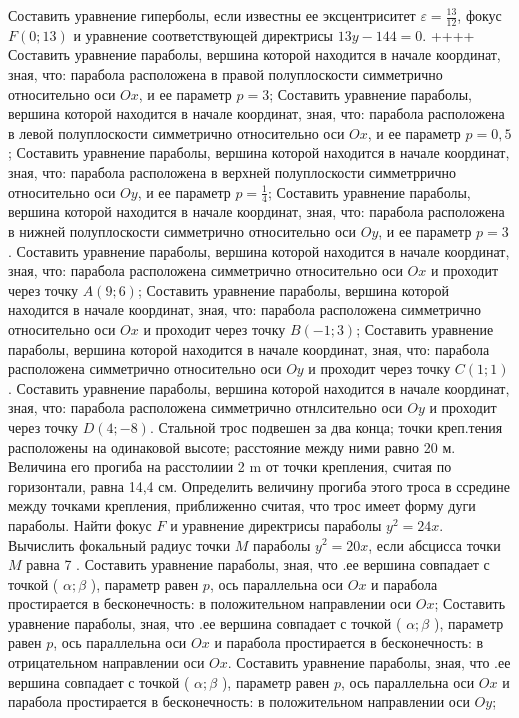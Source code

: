 Составить уравнение гиперболы, если известны ее эксцентриситет $\varepsilon=\frac{13}{12}$, фокус $F(0 ; 13)$ и уравнение соответствующей директрисы $13 y-144=0$.
++++
Составить уравнение параболы, вершина которой находится в начале координат, зная, что: парабола расположена в правой полуплоскости симметрично относительно оси $O x$, и ее параметр $p=3$;
Составить уравнение параболы, вершина которой находится в начале координат, зная, что: парабола расположена в левой полуплоскости симметрично относительно оси $O x$, и ее параметр $p=0,5$;
Составить уравнение параболы, вершина которой находится в начале координат, зная, что: парабола расположена в верхней полуплоскости симметррично относительно оси $O y$, и ее параметр $p=\frac{1}{4}$;
Составить уравнение параболы, вершина которой находится в начале координат, зная, что: парабола расположена в нижней полуплоскости симметрично относительно оси $O y$, и ее параметр $p=3$.
Составить уравнение параболы, вершина которой находится в начале координат, зная, что: парабола расположена симметрично относительно оси $O x$ и проходит через точку $A(9 ; 6)$;
Составить уравнение параболы, вершина которой находится в начале координат, зная, что: парабола расположена симметрично относительно оси $O x$ и проходит через точку $B(-1 ; 3)$;
Составить уравнение параболы, вершина которой находится в начале координат, зная, что: парабола расположена симметрично относительно оси $O y$ и проходит через точку $C(1 ; 1)$.
Составить уравнение параболы, вершина которой находится в начале координат, зная, что: парабола расположена симметрично отнлсительно оси $O y$ и проходит через точку $D(4 ;-8)$.
Стальной трос подвешен за два конца; точки креп.тения расположены на одинаковой высоте; расстояние между ними равно 20 м. Величина его прогиба на расстолиии 2 m от точки крепления, считая по горизонтали, равна 14,4 см. Определить величину прогиба этого троса в ссредине между точками крепления, приближенно считая, что трос имеет форму дуги параболы.
Найти фокус $F$ и уравнение директрисы параболы $y^2=24 x$.
Вычислить фокальный радиус точки $M$ параболы $y^2=20 x$, если абсцисса точки $M$ равна 7 .
Составить уравнение параболы, зная, что .ее вершина совпадает с точкой ( $\alpha ; \beta$ ), параметр равен $p$, ось параллельна оси $O x$ и парабола простирается в бесконечность: в положительном направлении оси $O x$;
Составить уравнение параболы, зная, что .ее вершина совпадает с точкой ( $\alpha ; \beta$ ), параметр равен $p$, ось параллельна оси $O x$ и парабола простирается в бесконечность: в отрицательном направлении оси $O x$.
Составить уравнение параболы, зная, что .ее вершина совпадает с точкой ( $\alpha ; \beta$ ), параметр равен $p$, ось параллельна оси $O x$ и парабола простирается в бесконечность: в положительном направлении оси $O y$;
